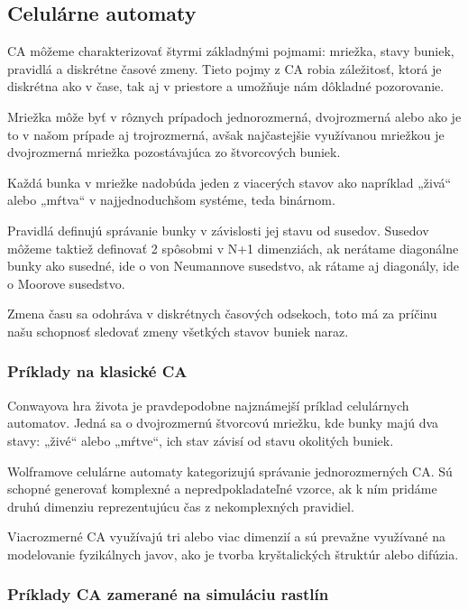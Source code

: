 \documentclass[12pt]{article}
\begin{document}
\subsection{Celulárne automaty}

CA môžeme charakterizovať štyrmi základnými pojmami: mriežka, stavy buniek,
pravidlá a diskrétne časové zmeny. Tieto pojmy z CA robia záležitosť, ktorá je
diskrétna ako v čase, tak aj v priestore a umožňuje nám dôkladné pozorovanie.

Mriežka môže byť v rôznych prípadoch jednorozmerná, dvojrozmerná alebo ako je
to v našom prípade aj trojrozmerná, avšak najčastejšie využívanou mriežkou je
dvojrozmerná mriežka pozostávajúca zo štvorcových buniek.

Každá bunka v mriežke nadobúda jeden z viacerých stavov ako napríklad „živá“
alebo „mŕtva“ v najjednoduchšom systéme, teda binárnom.

Pravidlá definujú správanie bunky v závislosti jej stavu od susedov. Susedov
môžeme taktiež definovať 2 spôsobmi v N+1 dimenziách, ak nerátame diagonálne
bunky ako susedné, ide o von Neumannove susedstvo, ak rátame aj diagonály,
ide o Moorove susedstvo. %

Zmena času sa odohráva v diskrétnych časových odsekoch, toto má za príčinu
našu schopnosť sledovať zmeny všetkých stavov buniek naraz.

\subsubsection{Príklady na klasické CA}

Conwayova hra života je pravdepodobne najznámejší príklad celulárnych
automatov. Jedná sa o dvojrozmernú štvorcovú mriežku, kde bunky majú dva stavy:
„živé“ alebo „mŕtve“, ich stav závisí od stavu okolitých buniek.

Wolframove celulárne automaty kategorizujú správanie jednorozmerných CA.
Sú schopné generovať komplexné a nepredpokladateľné vzorce, ak k ním pridáme
druhú dimenziu reprezentujúcu čas z nekomplexných pravidiel.

Viacrozmerné CA využívajú tri alebo viac dimenzií a sú prevažne využívané
na modelovanie fyzikálnych javov, ako je tvorba kryštalických štruktúr
alebo difúzia. %

\subsubsection{Príklady CA zamerané na simuláciu rastlín}
\end{document}
